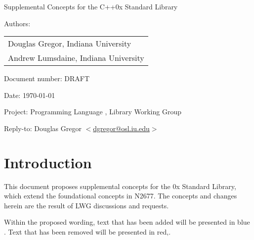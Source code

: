 \documentclass[american,twoside]{book}
\begin{document}
\raggedbottom

\begin{titlepage}
\begin{center}
\huge
Supplemental Concepts for the C++0x Standard Library
\vspace{0.25in}
\end{center}

\normalsize
\vspace{0.25in}
\par\noindent Authors: 
\begin{tabular}[t]{l}
Douglas Gregor, Indiana University \\
Andrew Lumsdaine, Indiana University
\end{tabular}\vspace{-6pt}

\par\noindent Document number: DRAFT\vspace{-6pt}
\par\noindent Date: \today\vspace{-6pt}
\par\noindent Project: Programming Language \Cpp{}, Library Working Group\vspace{-6pt}
\par\noindent Reply-to: Douglas Gregor $<$\href{mailto:dgregor@osl.iu.edu}{dgregor@osl.iu.edu}$>$\vspace{-6pt}

\section*{Introduction}
This document proposes supplemental concepts for the \Cpp0x Standard
Library, which extend the foundational concepts in N2677. The concepts
and changes herein are the result of LWG discussions and requests.

Within the proposed wording, text that has been added
\textcolor{addclr}{will be presented in blue} . Text that has been removed will be
presented \textcolor{remclr}{in red},. 


\end{titlepage}

\pagestyle{fancy}
\fancyhead[LE,RO]{\textbf{\rightmark}}
\fancyhead[RE]{\textbf{\leftmark\hspace{1em}\thepage}}
\fancyhead[LO]{\textbf{\thepage\hspace{1em}\leftmark}}
\end{document}

